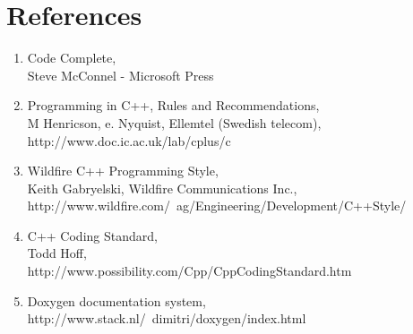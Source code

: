 \documentclass[a4paper,11pt,oneside]{scrbook}
\begin{document}
\chapter{References}
\label{cha:references}

\begin{enumerate}
  \item
    Code Complete, \\
    Steve McConnel - Microsoft Press
    \label{bib:1}

  \item
    Programming in C++, Rules and Recommendations, \\
    M Henricson, e. Nyquist, Ellemtel (Swedish telecom), \\
    http://www.doc.ic.ac.uk/lab/cplus/c%
    \label{bib:2}

  \item
    Wildfire C++ Programming Style, \\
    Keith Gabryelski, Wildfire Communications Inc., \\
    http://www.wildfire.com/~ag/Engineering/Development/C++Style/
    \label{bib:3}

  \item
    C++ Coding Standard, \\
    Todd Hoff, \\
    http://www.possibility.com/Cpp/CppCodingStandard.htm 
    \label{bib:4}

  \item
    Doxygen documentation system, \\
    http://www.stack.nl/~dimitri/doxygen/index.html
    \label{bib:5}
\end{enumerate}
%
\end{document}
